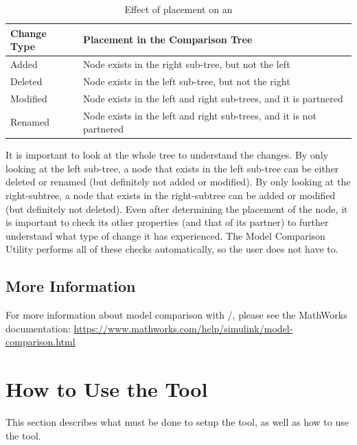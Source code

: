 \documentclass{article}
\makeatletter
\newcommand{\ToolName}{Model Comparison Utility\@\xspace}
\newcommand{\NodeObj}{\keyword{xmlcomp.Node}\@\xspace}
\makeatother
\begin{document}
\begin{table}[htb] 
\centering
\begin{tabular}{lp{26em}}
\hline 
Change Type & \NodeObj Placement in the Comparison Tree\\ \hline \hline
Added       & Node exists in the right sub-tree, but not the left \\ \hline
Deleted     & Node exists in the left sub-tree, but not the right \\ \hline
Modified    & Node exists in the left and right sub-trees, and it is partnered \\ \hline
Renamed     & Node exists in the left and right sub-trees, and it is not partnered \\ \hline                                                                       
\end{tabular}
\caption{Effect of placement on an \NodeObj}
\label{TBL:Placement}
\end{table}

It is important to look at the whole tree to understand the changes. By only looking at the left sub-tree, a node that exists in the left sub-tree can be either deleted or renamed (but definitely not added or modified). By only looking at the right-subtree, a node that exists in the right-subtree can be added or modified (but definitely not deleted). Even after determining the placement of the node, it is important to check its other properties (and that of its partner) to further understand what type of change it has experienced. The \ToolName performs all of these checks automatically, so the user does not have to.

\subsection{More Information}
For more information about model comparison with \Matlab/\Simulink, please see the MathWorks documentation: \newline
\url{https://www.mathworks.com/help/simulink/model-comparison.html}

\pagebreak	
\section{How to Use the Tool}
This section describes what must be done to setup the tool, as well as how to use the tool.
\end{document}
